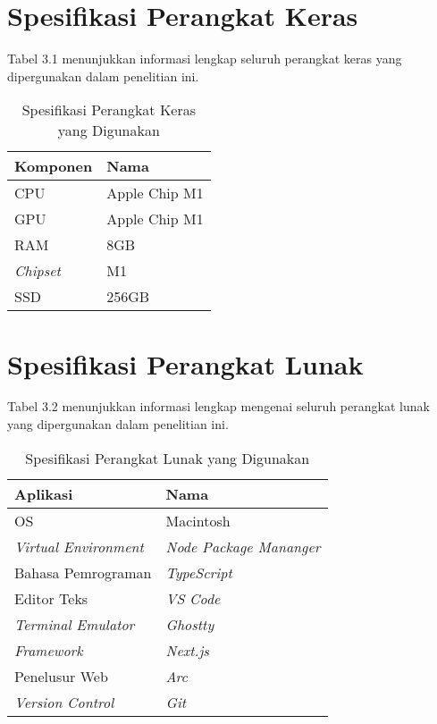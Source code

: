 \section{Spesifikasi Perangkat Keras}

Tabel 3.1 menunjukkan informasi lengkap seluruh perangkat keras yang
dipergunakan dalam penelitian ini.

\begin{table}[H]
  \caption{Spesifikasi Perangkat Keras yang Digunakan}

  \centering{}%
  \begin{tabular}{|l|l|}
    \hline
    \textbf{Komponen} & \textbf{Nama}\tabularnewline
    \hline
    \hline
    CPU               & Apple Chip M1\tabularnewline
    \hline
    GPU               & Apple Chip M1\tabularnewline
    \hline
    RAM               & 8GB\tabularnewline
    \hline
    \emph{Chipset}    & M1\tabularnewline
    \hline
    SSD               & 256GB\tabularnewline
    \hline
  \end{tabular}
\end{table}


\section{Spesifikasi Perangkat Lunak}

Tabel 3.2 menunjukkan informasi lengkap mengenai seluruh perangkat
lunak yang dipergunakan dalam penelitian ini.

\begin{table}[H]
  \caption{Spesifikasi Perangkat Lunak yang Digunakan}

  \centering{}%
  \begin{tabular}{|l|l|}
    \hline
    \textbf{Aplikasi}          & \textbf{Nama}\tabularnewline
    \hline
    \hline
    OS                         & Macintosh\tabularnewline
    \hline
    \emph{Virtual Environment} & \emph{Node Package Mananger}\tabularnewline
    \hline
    Bahasa Pemrograman         & \emph{TypeScript}\tabularnewline
    \hline
    Editor Teks                & \emph{VS Code}\tabularnewline
    \hline
    \emph{Terminal Emulator}   & \emph{Ghostty}\tabularnewline
    \hline
    \emph{Framework}           & \emph{Next.js}\tabularnewline
    \hline
    Penelusur Web              & \emph{Arc}\tabularnewline
    \hline
    \emph{Version Control}     & \emph{Git}\tabularnewline
    \hline
  \end{tabular}
\end{table}